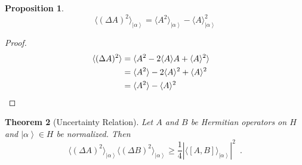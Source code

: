 \documentclass{book}
\let\qed\relax
\newtheorem{prop}{Proposition}[chapter]
\newtheorem{thm}[prop]{Theorem}
\theoremstyle{definition}
\newcommand{\ket}[1]{\ensuremath{\left| {#1} \right\rangle}}
\begin{document}
\begin{prop}
\[ \langle (\Delta A)^2 \rangle_{\ket{\alpha}} = \langle A^2 \rangle_{\ket{\alpha}} - \langle A \rangle_{\ket{\alpha}}^2 \]
\end{prop}

\begin{proof}
\pf
\begin{align*}
\langle (\Delta A)^2 \rangle & = \langle A^2 - 2 \langle A \rangle A + \langle A \rangle^2 \rangle \\
& = \langle A^2 \rangle - 2 \langle A \rangle^2 + \langle A \rangle^2 \\
& = \langle A^2 \rangle - \langle A \rangle^2 & \qed
\end{align*}
\end{proof}

\begin{thm}[Uncertainty Relation]
Let $A$ and $B$ be Hermitian operators on $H$ and $\ket{\alpha} \in H$ be normalized. Then
\[ \langle (\Delta A)^2 \rangle_{\ket{\alpha}} \langle (\Delta B)^2 \rangle_{\ket{\alpha}} \geq \frac{1}{4} |\langle [A,B] \rangle_{\ket{\alpha}}|^2 \enspace . \]
\end{thm}
\end{document}
